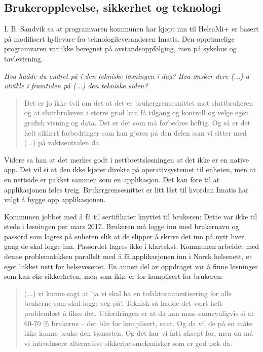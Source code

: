 \subsection{Brukeropplevelse, sikkerhet og teknologi}
I. B. Sandvik sa at programvaren kommunen har kjøpt inn til HelsaMi+ er basert på modifisert hyllevare fra teknologileverandøren Imatis. Den opprinnelige
programvaren var ikke beregnet på avstandsoppfølging, men på sykehus og tavlevisning. 

\textit{Hva hadde du endret på i den tekniske løsningen i dag? Hva ønsker dere (...) å utvikle i framtiden på (...) den tekniske siden?}

\blockquote{Det er jo ikke tvil om det at det er brukergrensesnittet mot sluttbrukeren og at sluttbrukeren i større grad kan få tilgang og
kontroll og velge egen grafisk visning og
data. Det er det som må forbedres heftig. Og så er det helt sikkert forbedringer som kan gjøres på den delen som vi sitter med
(...) på vaktsentralen da.}

Videre sa han at det merkes godt i nettbrettsløsningen at det ikke er en native app. Det vil si at den ikke kjører direkte på
operativsystemet til enheten,
men at en nettside er pakket sammen som en applikasjon. Det kan føre til at applikasjonen føles treig. Brukergrensesnittet er litt låst til
hvordan Imatis har valgt å bygge opp applikasjonen.

Kommunen jobbet med å få til sertifikater knyttet til brukeren:  Dette var ikke
til stede i løsningen per mars 2017. Brukeren må logge inn med brukernavn og passord som lagres på enheten slik at de
slipper å skrive det inn på nytt hver gang de skal logge inn. Passordet lagres ikke i klartekst.
Kommunen arbeidet med denne problematikken parallelt med å få applikasjonen inn i Norsk helsenett, et eget
lukket nett for helsevesenet. En annen del av oppdraget var å finne løsninger som kan øke sikkerheten, men som ikke er for komplisert for brukeren:
\blockquote{(...) vi kunne sagt at 'ja vi skal ha en tofaktorautentisering for alle brukerne som skal logge seg på'. Teknisk så hadde det
    vært helt problemløst å fikse det. Utfordringen er at da kan man sannsynligvis si at 60-70 \% brukerne -- det blir for komplisert, sant.
    Og da vil de på en måte ikke kunne bruke den tjenesten. Og det har vi fått aksept for, men da må vi introdusere alternative sikkerhetsmekanisker
som er god nok da.}

